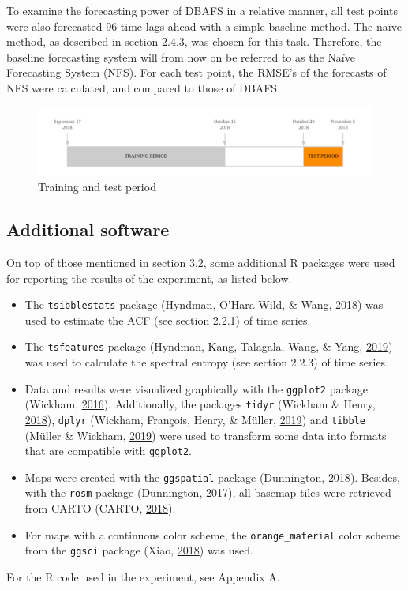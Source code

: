 \documentclass[12pt,oneside]{reedthesis}
\providecommand{\tightlist}{%
  \setlength{\itemsep}{0pt}\setlength{\parskip}{0pt}}
\begin{document}
To examine the forecasting power of DBAFS in a relative manner, all test
points were also forecasted 96 time lags ahead with a simple baseline
method. The naïve method, as described in section 2.4.3, was chosen for
this task. Therefore, the baseline forecasting system will from now on
be referred to as the Naïve Forecasting System (NFS). For each test
point, the RMSE's of the forecasts of NFS were calculated, and compared
to those of DBAFS.
\begin{figure}[h]
\includegraphics[width=\textwidth]{Figures/traintest} \caption{Training and test period}\label{fig:traintest}
\end{figure}
\subsection{Additional software}\label{additional-software}

On top of those mentioned in section 3.2, some additional R packages
were used for reporting the results of the experiment, as listed below.
\begin{itemize}
\tightlist
\item
  The \texttt{tsibblestats} package (Hyndman, O'Hara-Wild, \& Wang,
  \protect\hyperlink{ref-tsibblestats}{2018}) was used to estimate the
  ACF (see section 2.2.1) of time series.
\item
  The \texttt{tsfeatures} package (Hyndman, Kang, Talagala, Wang, \&
  Yang, \protect\hyperlink{ref-tsfeatures}{2019}) was used to calculate
  the spectral entropy (see section 2.2.3) of time series.
\item
  Data and results were visualized graphically with the \texttt{ggplot2}
  package (Wickham, \protect\hyperlink{ref-ggplot}{2016}). Additionally,
  the packages \texttt{tidyr} (Wickham \& Henry,
  \protect\hyperlink{ref-tidyr}{2018}), \texttt{dplyr} (Wickham,
  François, Henry, \& Müller, \protect\hyperlink{ref-dplyr}{2019}) and
  \texttt{tibble} (Müller \& Wickham,
  \protect\hyperlink{ref-tibble}{2019}) were used to transform some data
  into formats that are compatible with \texttt{ggplot2}.
\item
  Maps were created with the \texttt{ggspatial} package (Dunnington,
  \protect\hyperlink{ref-ggspatial}{2018}). Besides, with the
  \texttt{rosm} package (Dunnington,
  \protect\hyperlink{ref-rosm}{2017}), all basemap tiles were retrieved
  from CARTO (CARTO, \protect\hyperlink{ref-carto}{2018}).
\item
  For maps with a continuous color scheme, the \texttt{orange\_material}
  color scheme from the \texttt{ggsci} package (Xiao,
  \protect\hyperlink{ref-ggsci}{2018}) was used.
\end{itemize}
For the R code used in the experiment, see Appendix A.
\end{document}
